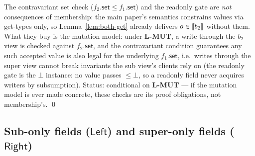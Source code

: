 \documentclass[11pt]{article}
\begin{document}
\begin{lemma}
\label{lem:both-set}
The contravariant set check
($f_2.\mathsf{set} \leq f_1.\mathsf{set}$) and the readonly gate are
\emph{not} consequences of membership: the main paper's semantics
constrains values via get-types only, so
Lemma~\ref{lem:both-get} already delivers $o \in \llbracket b_2 \rrbracket$ without
them. What they buy is the mutation model: under \textbf{L-MUT}, a write
through the $b_2$ view is checked against $f_2.\mathsf{set}$, and the
contravariant condition guarantees any such accepted value is also
legal for the underlying $f_1.\mathsf{set}$, i.e.\ writes through the
super view cannot break invariants the sub view's clients rely on
(the readonly gate is the $\bot$ instance: no value passes
$\leq \bot$, so a readonly field never acquires writers by subsumption).
Status: conditional on \textbf{L-MUT} --- if the mutation model is ever
made concrete, these checks are its proof obligations, not membership's.
\qed
\end{lemma}

\subsection{Sub-only fields ($\mathsf{Left}$) and super-only fields
($\mathsf{Right}$)}
\end{document}
